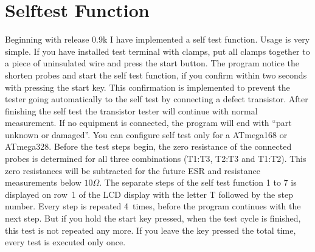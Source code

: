 
\section{Selftest Function}
\label{sec:selftest}
Beginning with release 0.9k I have implemented a self test function. Usage is very simple.
If you have installed  test terminal with clamps, put all clamps together to a piece of uninsulated wire and press the start button.
The program notice the shorten probes and start the self test function, if you confirm within two
seconds with pressing the start key. This confirmation is implemented to prevent the tester
going automatically to the self test by connecting a defect transistor.
After finishing the self test the transistor tester will continue with normal measurement.
If no equipment is connected, the program will end with ``part unknown or damaged''. 
You can configure self test only for a ATmega168  or ATmega328.
Before the test steps begin, the zero resistance of the connected probes is determined for all three combinations
(T1:T3, T2:T3 and T1:T2). This zero resistances will be subtracted for the future ESR and resistance measurements below \(10 \Omega\).
The separate steps of the self test function 1 to 7 is displayed on row~1 of the LCD display with the letter T
followed by the step number.
Every step is repeated 4~times, before the program continues with the next step.
But if you hold the start key pressed, when the test cycle is finished, this test is not repeated any more.
If you leave the key pressed the total time, every test is executed only once.


